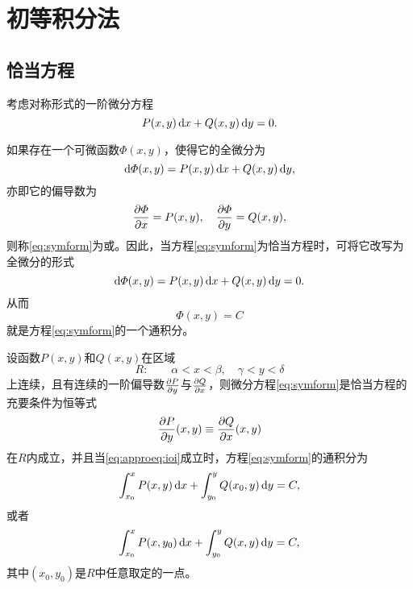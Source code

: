 \section{初等积分法}
\subsection{恰当方程}
考虑对称形式的一阶微分方程
\begin{equation}\label{eq:symform}
P(x,y)\,\mathrm{d} x+Q(x,y)\,\mathrm{d} y=0.
\end{equation}

如果存在一个可微函数$\varPhi(x,y)$，使得它的全微分为
\[
\mathrm{d}\varPhi(x,y)=P(x,y)\,\mathrm{d} x+Q(x,y)\,\mathrm{d} y,
\]
亦即它的偏导数为
\begin{equation}\label{eq:phipartialdiff}
\frac{\partial{}\varPhi}{\partial{}x}=P(x,y),\quad\frac{\partial{}\varPhi}{\partial{}y}=Q(x,y),
\end{equation}
则称\eqref{eq:symform}为或。因此，当方程\eqref{eq:symform}为恰当方程时，可将它改写为全微分的形式
\begin{equation*}
\mathrm{d}\varPhi(x,y)=P(x,y)\,\mathrm{d} x+Q(x,y)\,\mathrm{d} y=0.
\end{equation*}
从而
\begin{equation*}
\varPhi(x,y)=C
\end{equation*}
就是方程\ref{eq:symform}的一个通积分。
\begin{theo}\label{theo:approeq}%
设函数$P(x,y)$和$Q(x,y)$在区域
\[
R:\qquad \alpha<x<\beta,\quad\gamma<y<\delta
\]
上连续，且有连续的一阶偏导数$\tfrac{\partial{}P}{\partial{}y}$与$\tfrac{\partial{}Q}{\partial{}x}$，则微分方程\eqref{eq:symform}是恰当方程的充要条件为恒等式
\begin{equation}\label{eq:approeq:ioi}
\frac{\partial{}P}{\partial{}y}(x,y)\equiv\frac{\partial{}Q}{\partial{}x}(x,y)
\end{equation}
在$R$内成立，并且当\eqref{eq:approeq:ioi}成立时，方程\eqref{eq:symform}的通积分为
\[
\int_{x_0}^xP(x,y)\,\mathrm{d} x+\int_{y_0}^yQ(x_0,y)\,\mathrm{d} y=C,
\]
或者
\[
\int_{x_0}^xP(x,y_0)\,\mathrm{d} x+\int_{y_0}^yQ(x,y)\,\mathrm{d} y=C,
\]
其中$(x_0,y_0)$是$R$中任意取定的一点。
\end{theo}

